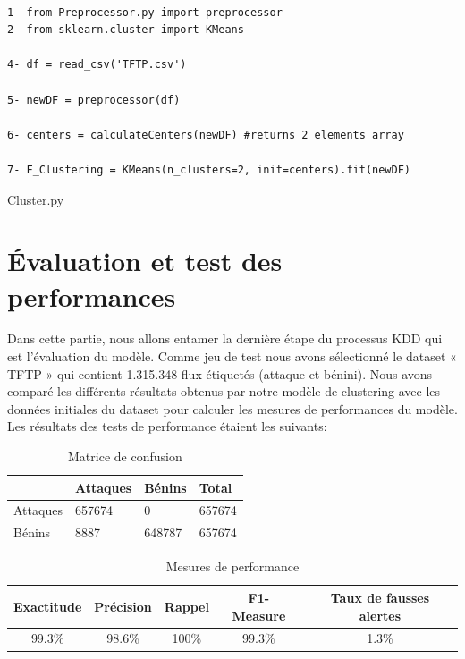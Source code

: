 \begin{algorithm}[H]
\begin{verbatim}

1- from Preprocessor.py import preprocessor 
2- from sklearn.cluster import KMeans

4- df = read_csv('TFTP.csv')

5- newDF = preprocessor(df)

6- centers = calculateCenters(newDF) #returns 2 elements array

7- F_Clustering = KMeans(n_clusters=2, init=centers).fit(newDF) 
\end{verbatim}
\caption{Cluster.py}
\end{algorithm}

\section{Évaluation et test des performances}
\label{tests}
Dans cette partie, nous allons entamer la dernière étape du processus KDD qui est l'évaluation du modèle. Comme jeu de test nous avons sélectionné le dataset « TFTP » qui contient 1.315.348 flux étiquetés (attaque et bénini). Nous avons comparé les différents résultats obtenus par notre modèle de clustering avec les données initiales du dataset pour calculer les mesures de performances du modèle.\\

\noindent Les résultats des tests de performance étaient les suivants: 

\begin{table}[H]
	\begin{center}
		\begin{tabular}{  | m{2.5cm} | m{2.5cm} | m{2.5cm} || m{2cm} | }
			\hline
			  & Attaques & Bénins & Total\\
			\hline
			Attaques & 657674 & 0 & 657674\\
			\hline
			Bénins & 8887 & 648787 & 657674\\
			\hline
		\end{tabular}
		\caption{Matrice de confusion}
	\end{center}
	\label{table:re}
\end{table}

\begin{table}[H]
	\begin{center}
		\begin{tabular}{  | c | c | c | c | c | }
			\hline
			\rowcolor[rgb]{0.85,0.85,0.85}
			 Exactitude & Précision & Rappel & F1-Measure & Taux de fausses alertes\\
			\hline
			99.3\% & 98.6\% & 100\% & 99.3\% & 1.3\%\\
			\hline
		\end{tabular}
		\caption{Mesures de performance }
	\end{center}
	\label{table:F_Clustering_Evaluation}
\end{table}

